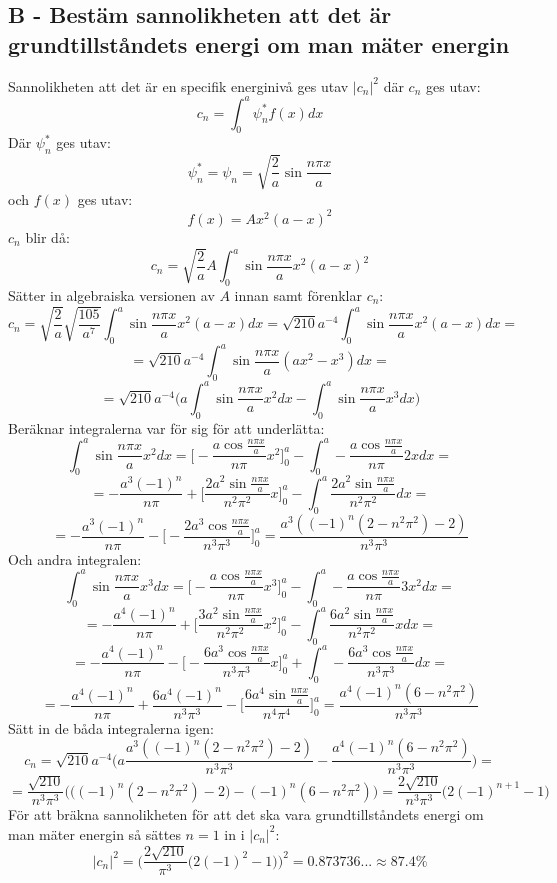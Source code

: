 \documentclass{article}
\begin{document}
      \subsection*{B - Bestäm sannolikheten att det är grundtillståndets energi om man mäter energin}
        Sannolikheten att det är en specifik energinivå ges utav $|c_n|^2$ där $c_n$ ges utav:
        \[
          c_n=\int_0^a\psi_n^*f(x)dx
        \]
        Där $\psi_n^*$ ges utav:
        \[
          \psi_n^*=\psi_n=\sqrt{\frac{2}{a}}\sin{\frac{n\pi x}{a}}
        \]
        och $f(x)$ ges utav:
        \[
          f(x)=Ax^2(a-x)^2
        \]
        $c_n$ blir då:
        \[
          c_n=\sqrt{\frac{2}{a}}A\int_0^a\sin{\frac{n\pi x}{a}}x^2(a-x)^2
        \]
        Sätter in algebraiska versionen av $A$ innan samt förenklar $c_n$:
        \[
          c_n=\sqrt{\frac{2}{a}}\sqrt{\frac{105}{a^7}}\int_0^a\sin{\frac{n\pi x}{a}}x^2(a-x)dx=\sqrt{210}a^{-4}\int_0^a\sin{\frac{n\pi x}{a}}x^2(a-x)dx=
        \]
        \[
          =\sqrt{210}a^{-4}\int_0^a\sin{\frac{n\pi x}{a}}(ax^2-x^3)dx=
        \]
        \[
          =\sqrt{210}a^{-4}\bigg(a\int_0^a\sin{\frac{n\pi x}{a}}x^2dx-\int_0^a\sin{\frac{n\pi x}{a}}x^3dx\bigg)
        \]
        Beräknar integralerna var för sig för att underlätta:
        \[
          \int_0^a\sin{\frac{n\pi x}{a}}x^2dx=\bigg[-\frac{a\cos{\frac{n\pi x}{a}}}{n\pi}x^2\bigg]_0^a-\int_0^a-\frac{a\cos{\frac{n\pi x}{a}}}{n\pi}2xdx=
        \]
        \[
          =-\frac{a^3(-1)^n}{n\pi}+\bigg[\frac{2a^2\sin{\frac{n\pi x}{a}}}{n^2\pi^2}x\bigg]_0^a-\int_0^a\frac{2a^2\sin{\frac{n\pi x}{a}}}{n^2\pi^2}dx=
        \]
        \[
          =-\frac{a^3(-1)^n}{n\pi}-\bigg[-\frac{2a^3\cos{\frac{n\pi x}{a}}}{n^3\pi^3}\bigg]_0^a=\frac{a^3((-1)^n(2-n^2\pi^2)-2)}{n^3\pi^3}
        \]
        Och andra integralen:
        \[
          \int_0^a\sin{\frac{n\pi x}{a}}x^3dx=\bigg[-\frac{a\cos{\frac{n\pi x}{a}}}{n\pi}x^3\bigg]_0^a-\int_0^a-\frac{a\cos{\frac{n\pi x}{a}}}{n\pi}3x^2dx=
        \]
        \[
          =-\frac{a^4(-1)^n}{n\pi}+\bigg[\frac{3a^2\sin{\frac{n\pi x}{a}}}{n^2\pi^2}x^2\bigg]_0^a-\int_0^a\frac{6a^2\sin{\frac{n\pi x}{a}}}{n^2\pi^2}xdx=
        \]
        \[
          =-\frac{a^4(-1)^n}{n\pi}-\bigg[-\frac{6a^3\cos{\frac{n\pi x}{a}}}{n^3\pi^3}x\bigg]_0^a+\int_0^a-\frac{6a^3\cos{\frac{n\pi x}{a}}}{n^3\pi^3}dx=
        \]
        \[
          =-\frac{a^4(-1)^n}{n\pi}+\frac{6a^4(-1)^n}{n^3\pi^3}-\bigg[\frac{6a^4\sin{\frac{n\pi x}{a}}}{n^4\pi^4}\bigg]_0^a=\frac{a^4(-1)^n(6-n^2\pi^2)}{n^3\pi^3}
        \]
        Sätt in de båda integralerna igen:
        \[
          c_n=\sqrt{210}a^{-4}\bigg(a\frac{a^3((-1)^n(2-n^2\pi^2)-2)}{n^3\pi^3}-\frac{a^4(-1)^n(6-n^2\pi^2)}{n^3\pi^3}\bigg)=
        \]
        \[
          =\frac{\sqrt{210}}{n^3\pi^3}\bigg(\big((-1)^n(2-n^2\pi^2)-2\big)-(-1)^n(6-n^2\pi^2)\bigg)=\frac{2\sqrt{210}}{n^3\pi^3}\bigg(2(-1)^{n+1}-1\bigg)
        \]
        För att bräkna sannolikheten för att det ska vara grundtillståndets energi om man mäter energin så sättes $n=1$ in i $|c_n|^2$:
        \[
          |c_n|^2=\bigg(\frac{2\sqrt{210}}{\pi^3}\big(2(-1)^{2}-1\big)\bigg)^2=0.873736...\approx87.4\%
        \]
\end{document}
